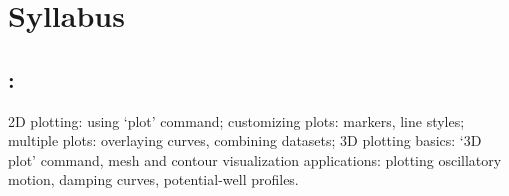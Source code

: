 \section*{Syllabus}

    \subsection*{\topicSubTitle: \topicTitle}
        2D plotting: using `plot' command; customizing plots: markers, line styles; multiple plots: overlaying curves, combining datasets; 3D plotting basics: `3D plot' command, mesh and contour visualization applications: plotting oscillatory motion, damping curves, potential-well profiles.